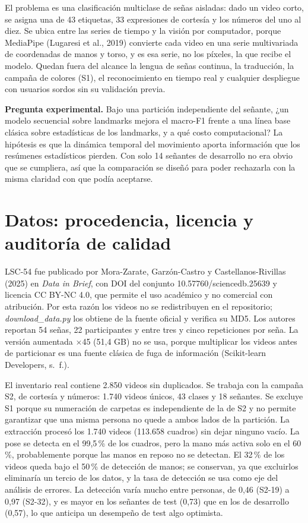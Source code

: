 \documentclass[11pt,a4paper]{article}
\newcommand{\code}[1]{\textit{#1}}
\begin{document}
El problema es una clasificación multiclase de señas aisladas: dado un video corto, se asigna una de 43 etiquetas, 33 expresiones de cortesía y los números del uno al diez. Se ubica entre las series de tiempo y la visión por computador, porque MediaPipe (Lugaresi et al., 2019) convierte cada video en una serie multivariada de coordenadas de manos y torso, y es esa serie, no los píxeles, la que recibe el modelo. Quedan fuera del alcance la lengua de señas continua, la traducción, la campaña de colores (S1), el reconocimiento en tiempo real y cualquier despliegue con usuarios sordos sin su validación previa.

\textbf{Pregunta experimental.} Bajo una partición independiente del señante, ¿un modelo secuencial sobre landmarks mejora el macro-F1 frente a una línea base clásica sobre estadísticas de los landmarks, y a qué costo computacional? La hipótesis es que la dinámica temporal del movimiento aporta información que los resúmenes estadísticos pierden. Con solo 14 señantes de desarrollo no era obvio que se cumpliera, así que la comparación se diseñó para poder rechazarla con la misma claridad con que podía aceptarse.

\section{Datos: procedencia, licencia y auditoría de calidad}

LSC-54 fue publicado por Mora-Zarate, Garzón-Castro y Castellanos-Rivillas (2025) en \emph{Data in Brief}, con DOI del conjunto 10.57760/sciencedb.25639 y licencia CC BY-NC 4.0, que permite el uso académico y no comercial con atribución. Por esta razón los videos no se redistribuyen en el repositorio; \code{download\_data.py} los obtiene de la fuente oficial y verifica su MD5. Los autores reportan 54 señas, 22 participantes y entre tres y cinco repeticiones por seña. La versión aumentada $\times$45 (51,4 GB) no se usa, porque multiplicar los videos antes de particionar es una fuente clásica de fuga de información (Scikit-learn Developers, s.~f.).

El inventario real contiene 2.850 videos sin duplicados. Se trabaja con la campaña S2, de cortesía y números: 1.740 videos únicos, 43 clases y 18 señantes. Se excluye S1 porque su numeración de carpetas es independiente de la de S2 y no permite garantizar que una misma persona no quede a ambos lados de la partición. La extracción procesó los 1.740 videos (113.658 cuadros) sin dejar ninguno vacío. La pose se detecta en el 99,5\,\% de los cuadros, pero la mano más activa solo en el 60\,\%, probablemente porque las manos en reposo no se detectan. El 32\,\% de los videos queda bajo el 50\,\% de detección de manos; se conservan, ya que excluirlos eliminaría un tercio de los datos, y la tasa de detección se usa como eje del análisis de errores. La detección varía mucho entre personas, de 0,46 (S2-19) a 0,97 (S2-32), y es mayor en los señantes de test (0,73) que en los de desarrollo (0,57), lo que anticipa un desempeño de test algo optimista.
\end{document}
